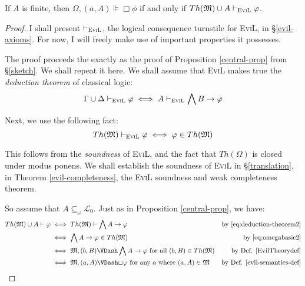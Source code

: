 \begin{theorem}\label{theorem-theorem}
  If $A$ is finite, then $\Omega, (a,A) \VDash \Box \phi$ if and only if $Th(\Omega) \cup A \vdash_{\text{\textsc{EviL}}} \phi$.
\end{theorem}
\begin{proof}
I shall present $\vdash_{\text{\textsc{EviL}}}$, the logical
consequence turnstile for \textsc{EviL}, in \S\ref{evil-axioms}.  For
now, I will freely make use of important properties it possesses.

  The proof proceeds the exactly as the proof of Proposition
  \ref{central-prop} from \S\ref{sketch}.  We shall repeat it here.
  We shall assume that \textsc{EviL} makes true the \emph{deduction theorem} of classical logic:
\begin{equation}
\Gamma \cup \Delta \vdash_{\text{\textsc{EviL}}} \phi 
   \iff A \vdash_{\text{\textsc{EviL}}} \bigwedge B \to \phi 
     \label{eq:deduction-theorem2}
\end{equation}

Next, we use the following fact:
\begin{equation}
Th(\Omega) \vdash_{\text{\textsc{EviL}}} \phi \iff \phi \in Th(\Omega) \label{eq:omegabasic2}
\end{equation}

This follows from the \emph{soundness} of \textsc{EviL}, and the fact
that $Th(\Omega)$ is closed under modus ponens.  We shall establish the
soundness of \textsc{EviL} in \S\ref{translation}, in Theorem
\ref{evil-completeness}, the \textsc{EviL} soundness and weak
completeness theorem.

So assume that $A \subseteq_\omega \mathcal{L}_0$.  Just as in
Proposition \ref{central-prop}, we have:
\begin{align*}
  Th(\Omega) \cup A \vdash \phi & \iff   Th(\Omega) \vdash \bigwedge A
  \to \phi 
   & \textup{by \eqref{eq:deduction-theorem2}} 
\\
 & \iff \bigwedge A \to \phi \in Th(\Omega) & \textup{by
   \eqref{eq:omegabasic2}} \\
 & \iff \Omega, (b,B) \VDash \bigwedge A \to \phi \textup{ for all
   $(b,B) \in Th(\Omega)$} & \textup{by Def. \ref{EvilTheorydef}} \\
 & \iff \Omega,(a,A) \VDash \Box \phi \textup{ for any $a$ where
   $(a,A) \in \Omega$} & \textup{by Def. \ref{evil-semantics-def}}
\end{align*}

\end{proof}



